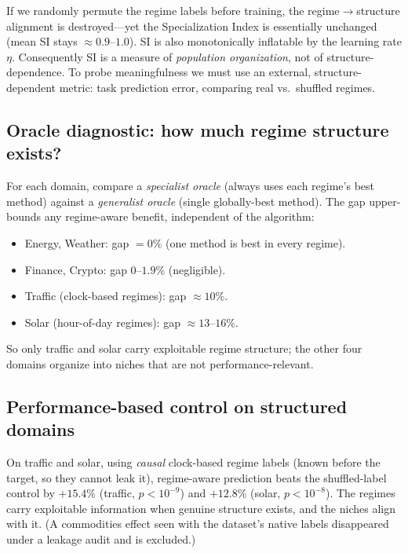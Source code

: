 \documentclass[11pt,a4paper]{article}
\theoremstyle{definition}
\theoremstyle{plain}
\begin{document}
If we randomly permute the regime labels before training, the regime$\to$structure
alignment is destroyed---yet the Specialization Index is essentially unchanged
(mean SI stays $\approx 0.9$--$1.0$). SI is also monotonically inflatable by the
learning rate $\eta$. Consequently SI is a measure of \emph{population
organization}, not of structure-dependence. To probe meaningfulness we must use an
external, structure-dependent metric: task prediction error, comparing real vs.\
shuffled regimes.

\subsection{Oracle diagnostic: how much regime structure exists?}

For each domain, compare a \emph{specialist oracle} (always uses each regime's best
method) against a \emph{generalist oracle} (single globally-best method). The gap
upper-bounds any regime-aware benefit, independent of the algorithm:

\begin{itemize}
    \item Energy, Weather: gap $= 0\%$ (one method is best in every regime).
    \item Finance, Crypto: gap $0$--$1.9\%$ (negligible).
    \item Traffic (clock-based regimes): gap $\approx 10\%$.
    \item Solar (hour-of-day regimes): gap $\approx 13$--$16\%$.
\end{itemize}

So only traffic and solar carry exploitable regime structure; the other four
domains organize into niches that are not performance-relevant.

\subsection{Performance-based control on structured domains}

On traffic and solar, using \emph{causal} clock-based regime labels (known before
the target, so they cannot leak it), regime-aware prediction beats the
shuffled-label control by $+15.4\%$ (traffic, $p < 10^{-9}$) and $+12.8\%$ (solar,
$p < 10^{-8}$). The regimes carry exploitable information when genuine structure
exists, and the niches align with it. (A commodities effect seen with the
dataset's native labels disappeared under a leakage audit and is excluded.)
\end{document}
